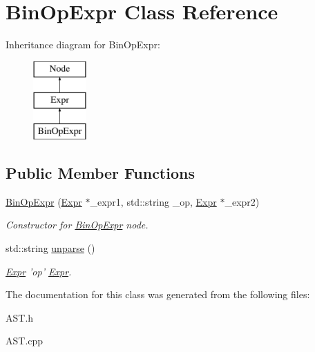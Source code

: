 \hypertarget{classBinOpExpr}{\section{Bin\-Op\-Expr Class Reference}
\label{classBinOpExpr}
}
Inheritance diagram for Bin\-Op\-Expr\-:\begin{figure}[H]
\begin{center}
\leavevmode
\includegraphics[height=3.000000cm]{classBinOpExpr}
\end{center}
\end{figure}
\subsection*{Public Member Functions}
\begin{DoxyCompactItemize}
\item 
\hypertarget{classBinOpExpr_a8f70bcea569210a4af6e3912c568502c}{\hyperlink{classBinOpExpr_a8f70bcea569210a4af6e3912c568502c}{Bin\-Op\-Expr} (\hyperlink{classExpr}{Expr} $\ast$\-\_\-expr1, std\-::string \-\_\-op, \hyperlink{classExpr}{Expr} $\ast$\-\_\-expr2)}\label{classBinOpExpr_a8f70bcea569210a4af6e3912c568502c}

\begin{DoxyCompactList}\small\item\em Constructor for \hyperlink{classBinOpExpr}{Bin\-Op\-Expr} node. \end{DoxyCompactList}\item 
\hypertarget{classBinOpExpr_a695fc973bc681fcceda2f81130098649}{std\-::string \hyperlink{classBinOpExpr_a695fc973bc681fcceda2f81130098649}{unparse} ()}\label{classBinOpExpr_a695fc973bc681fcceda2f81130098649}

\begin{DoxyCompactList}\small\item\em \hyperlink{classExpr}{Expr} 'op' \hyperlink{classExpr}{Expr}. \end{DoxyCompactList}\end{DoxyCompactItemize}


The documentation for this class was generated from the following files\-:\begin{DoxyCompactItemize}
\item 
A\-S\-T.\-h\item 
A\-S\-T.\-cpp\end{DoxyCompactItemize}
